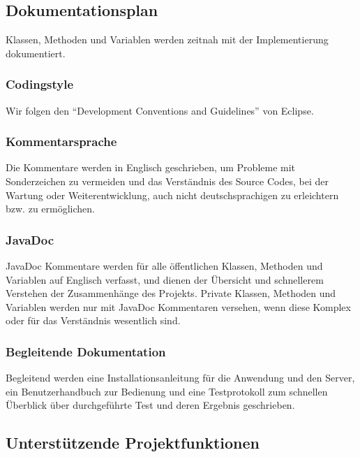 \subsection{Dokumentationsplan}

Klassen, Methoden und Variablen werden zeitnah mit der Implementierung dokumentiert.

\subsubsection{Codingstyle}

Wir folgen den "`Development Conventions and Guidelines"' von Eclipse. \cite{guideline}

\subsubsection{Kommentarsprache}

Die Kommentare werden in Englisch geschrieben, um Probleme mit Sonderzeichen zu vermeiden und das Verständnis des Source Codes, bei der Wartung oder Weiterentwicklung, auch nicht deutschsprachigen zu erleichtern bzw. zu ermöglichen.

\subsubsection{JavaDoc}

JavaDoc Kommentare werden für alle öffentlichen Klassen, Methoden und Variablen auf Englisch verfasst, und dienen der Übersicht und schnellerem Verstehen der Zusammenhänge des Projekts.
Private Klassen, Methoden und Variablen werden nur mit JavaDoc Kommentaren versehen, wenn diese Komplex oder für das Verständnis wesentlich sind.

\subsubsection{Begleitende Dokumentation}

Begleitend werden eine Installationsanleitung für die Anwendung und den Server, ein Benutzerhandbuch zur Bedienung und eine Testprotokoll zum schnellen Überblick über durchgeführte Test und deren Ergebnis geschrieben.

\subsection{Unterstützende Projektfunktionen}

